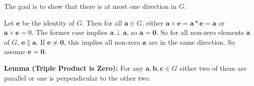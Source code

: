 
The goal is to show that there is at most one direction in $G$.

Let $\mathbf{e}$ be the identity of $G$. Then for all $\mathbf{a}\in G$, either $\mathbf{a}\times\mathbf{e}=\mathbf{a}*\mathbf{e}=\mathbf{a}$ or $\mathbf{a}\times\mathbf{e}=0$. The former case implies $\mathbf{a}\perp\mathbf{a}$, so $\mathbf{a}=\mathbf{0}$. So for all non-zero elements $\mathbf{a}$ of $G$, $\mathbf{e}\parallel\mathbf{a}$. If $\mathbf{e}\neq\mathbf{0}$, this implies all non-zero $\mathbf{a}$ are in the same direction. So assume $\mathbf{e}=\mathbf{0}$.

\textbf{Lemma (Triple Product is Zero):} For any $\mathbf{a},\mathbf{b},\mathbf{c}\in G$ either two of them are parallel or one is perpendicular to the other two.


